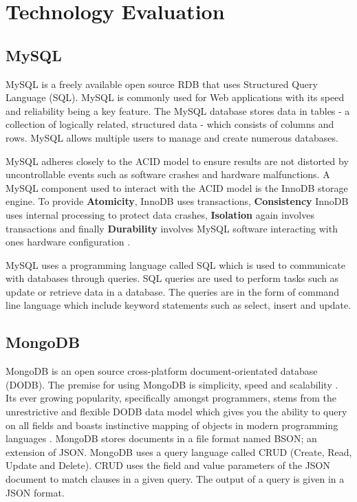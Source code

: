 \section{Technology Evaluation}\label{techeval}
\subsection{MySQL}\label{mysql}
MySQL is a freely available open source RDB that uses Structured Query Language (SQL). MySQL is commonly used for Web applications with its speed and reliability being a key feature. The MySQL database stores data in tables - a collection of logically related, structured data - which consists of columns and rows. MySQL allows multiple users to manage and create numerous databases.

MySQL adheres closely to the ACID model to ensure results are not distorted by uncontrollable events such as software crashes and hardware malfunctions. A MySQL component used to interact with the ACID model is the InnoDB storage engine. To provide \textbf{Atomicity}, InnoDB uses transactions, \textbf{Consistency} InnoDB uses internal processing to protect data crashes, \textbf{Isolation} again involves transactions and finally \textbf{Durability} involves MySQL software interacting with ones hardware configuration \cite{mysqlacid}.

MySQL uses a programming language called SQL which is used to communicate with databases through queries. SQL queries are used to perform tasks such as update or retrieve data in a database. The queries are in the form of command line language which include keyword statements such as select, insert and update.

\subsection{MongoDB}\label{mongo}
MongoDB is an open source cross-platform document-orientated database (DODB). The premise for using MongoDB is simplicity, speed and scalability \cite{md}. Its ever growing popularity, specifically amongst programmers, stems from the unrestrictive and flexible DODB data model which gives you the ability to query on all fields and boasts instinctive mapping of objects in modern programming languages \cite{md}. MongoDB stores documents in a file format named BSON; an extension of JSON. MongoDB uses a query language called CRUD (Create, Read, Update and Delete). CRUD uses the field and value parameters of the JSON document to match clauses in a given query. The output of a query is given in a JSON format.

